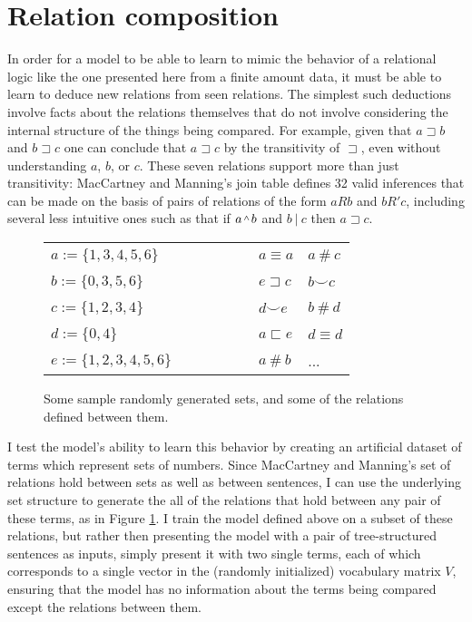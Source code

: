 \section{Relation composition}

In order for a model to be able to learn to mimic the behavior of a relational logic like the one presented here from a finite amount data, it must be able to learn to deduce new relations from seen relations. The simplest such deductions involve facts about the relations themselves that do not involve considering the internal structure of the things being compared. For example, given that $a\sqsupset b$ and $b\sqsupset c$ one can conclude that $a\sqsupset c$ by the transitivity of $\sqsupset$, even without understanding $a$, $b$, or $c$. These seven relations support more than just transitivity: MacCartney and Manning's \cite{maccartney2009extended} join table defines 32 valid inferences that can be made on the basis of pairs of relations of the form $a R b$ and $b R' c$, including several less intuitive ones such as that if $a \natneg b$ and $b~|~c$ then $a \sqsupset c$. 

\begin{figure}[t]
\begin{center}
\begin{tabular}{ll|lll}
$a := \{1, 3, 4, 5, 6\}	$&~~~&~~~& $a \equiv a$	    	& $a~\#~c$	\\
$b := \{0, 3, 5, 6\}	$&~~~&~~~& $e \sqsupset c$	&$b \smallsmile c$		\\
$c := \{1, 2, 3, 4\}	$&~~~&~~~& $d \smallsmile e$	& $b~\#~d$		\\
$d := \{0, 4\}		$&~~~&~~~& $a \sqsubset e$	& $ d \equiv d$	\\
$e := \{1, 2, 3, 4, 5, 6\}$&~~~&~~~& $a~\#~b$		& ... 	\\
\end{tabular}
\end{center}

\caption{Some sample randomly generated sets, and some of the relations defined between them.  \label{lattice-figure}} 
\end{figure}


I test the model's ability to learn this behavior by creating an artificial dataset of terms which represent sets of numbers. Since MacCartney and Manning's set of relations hold between sets as well as between sentences, I can use the underlying set structure to generate the all of the relations that hold between any pair of these terms, as in Figure \ref{lattice-figure}. I train the model defined above on a subset of these relations, but rather then presenting the model with a pair of tree-structured sentences as inputs, simply present it with two single terms, each of which corresponds to a single vector in the (randomly initialized) vocabulary matrix $V$, ensuring that the model has no information about the terms being compared except the relations between them.

